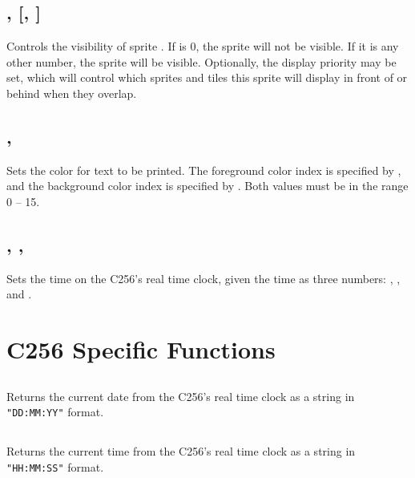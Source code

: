 \documentclass{report}
\begin{document}
    \subsection*{ ,  [,  ]}

    Controls the visibility of sprite .
    If  is 0, the sprite will not be visible.
    If it is any other number, the sprite will be visible.
    Optionally, the display priority  may be set, which will control
    which sprites and tiles this sprite will display in front of or behind when
    they overlap.

    \subsection*{ , }

    Sets the color for text to be printed.
    The foreground color index is specified by ,
    and the background color index is specified by .
    Both values must be in the range 0 -- 15.

    \subsection*{ , , }

    Sets the time on the C256's real time clock, given the time as three numbers:
    , , and .

    \section*{C256 Specific Functions}

    \subsection*{}

    Returns the current date from the C256's real time clock as a string
    in \verb+"DD:MM:YY"+ format.

    \subsection*{}

    Returns the current time from the C256's real time clock as a string
    in \verb+"HH:MM:SS"+ format.    
\end{document}
